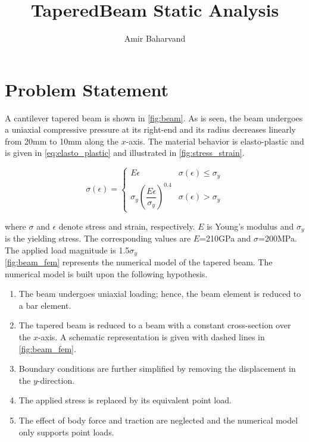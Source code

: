 \documentclass{article}
\title{TaperedBeam Static Analysis}
\author{Amir Baharvand }
\date{}
\begin{document}
\maketitle

\section{Problem Statement}
A cantilever tapered beam is shown in \cref{fig:beam}. As is seen, the beam undergoes a uniaxial compressive pressure at its right-end and its radius decreases linearly from 20mm to 10mm along the $x$-axis. The material behavior is elasto-plastic and is given in \cref{eq:elasto_plastic} and illustrated in \cref{fig:stress_strain}.

\begin{equation}
    \sigma(\epsilon) = 
    \begin{cases}
    E \epsilon & \sigma(\epsilon) \le \sigma_y\\ 
    \sigma_y \left( \dfrac{E \epsilon}{\sigma_y} \right)^{0.4} & \sigma(\epsilon) > \sigma_y
    \end{cases}
    \label{eq:elasto_plastic}
\end{equation}

where $\sigma$ and $\epsilon$ denote stress and strain, respectively. $E$ is Young's modulus and $\sigma_y$ is the yielding stress. The corresponding values are $E$=210GPa and $\sigma$=200MPa. The applied load magnitude is 1.5$\sigma_y$\\

\cref{fig:beam_fem} represents the numerical model of the tapered beam. The numerical model is built upon the following hypothesis.

\begin{enumerate}
    \item The beam undergoes uniaxial loading; hence, the beam element is reduced to a bar element.
    \item The tapered beam is reduced to a beam with a constant cross-section over the $x$-axis. A schematic representation is given with dashed lines in \cref{fig:beam_fem}.
    \item Boundary conditions are further simplified by removing the displacement in the $y$-direction.
    \item The applied stress is replaced by its equivalent point load.
    \item The effect of body force and traction are neglected and the numerical model only supports point loads.
\end{enumerate}
\end{document}
